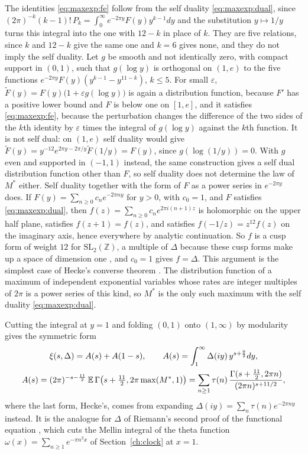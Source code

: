 \begin{remark}\label{rem:maxexp:fe}
The identities \eqref{eq:maxexp:fe} follow from the self duality \eqref{eq:maxexp:dual}, since $(2\pi)^{-k}(k-1)!\,P_k=\int_0^\infty e^{-2\pi y}F(y)y^{k-1}dy$ and the substitution $y\mapsto1/y$ turns this integral into the one with $12-k$ in place of $k$. They are five relations, since $k$ and $12-k$ give the same one and $k=6$ gives none, and they do not imply the self duality. Let $g$ be smooth and not identically zero, with compact support in $(0,1)$, such that $g(\log y)$ is orthogonal on $(1,e)$ to the five functions $e^{-2\pi y}F(y)(y^{k-1}-y^{11-k})$, $k\le5$. For small $\varepsilon$, $\tilde F(y)=F(y)\big(1+\varepsilon g(\log y)\big)$ is again a distribution function, because $F'$ has a positive lower bound and $F$ is below one on $[1,e]$, and it satisfies \eqref{eq:maxexp:fe}, because the perturbation changes the difference of the two sides of the $k$th identity by $\varepsilon$ times the integral of $g(\log y)$ against the $k$th function. It is not self dual: on $(1,e)$ self duality would give $\tilde F(y)=y^{-12}e^{2\pi y-2\pi/y}\tilde F(1/y)=F(y)$, since $g(\log(1/y))=0$. With $g$ even and supported in $(-1,1)$ instead, the same construction gives a self dual distribution function other than $F$, so self duality does not determine the law of $M^*$ either. Self duality together with the form of $F$ as a power series in $e^{-2\pi y}$ does. If $F(y)=\sum_{n\ge0}c_ne^{-2\pi ny}$ for $y>0$, with $c_0=1$, and $F$ satisfies \eqref{eq:maxexp:dual}, then $f(z)=\sum_{n\ge0}c_ne^{2\pi i(n+1)z}$ is holomorphic on the upper half plane, satisfies $f(z+1)=f(z)$, and satisfies $f(-1/z)=z^{12}f(z)$ on the imaginary axis, hence everywhere by analytic continuation. So $f$ is a cusp form of weight $12$ for $\mathrm{SL}_2(\mathbb Z)$, a multiple of $\Delta$ because these cusp forms make up a space of dimension one \cite[Chapter 14]{IwaniecKowalski04}, and $c_0=1$ gives $f=\Delta$. This argument is the simplest case of Hecke's converse theorem \cite{Hecke36}. The distribution function of a maximum of independent exponential variables whose rates are integer multiples of $2\pi$ is a power series of this kind, so $M^*$ is the only such maximum with the self duality \eqref{eq:maxexp:dual}.
\end{remark}

Cutting the integral at $y=1$ and folding $(0,1)$ onto $(1,\infty)$ by modularity gives the symmetric form
\begin{gather}
\xi(s,\Delta)=A(s)+A(1-s),\qquad A(s)=\int_1^\infty\Delta(iy)\,y^{s+\frac92}dy,\label{eq:maxexp:sym}\\
A(s)=(2\pi)^{-s-\frac{11}2}\,\mathbb{E}\,\Gamma\big(s+\tfrac{11}2,2\pi\max(M^*,1)\big)=\sum_{n\ge1}\tau(n)\,\frac{\Gamma(s+\frac{11}2,2\pi n)}{(2\pi n)^{s+11/2}},\nonumber
\end{gather}
where the last form, Hecke's, comes from expanding $\Delta(iy)=\sum_n\tau(n)e^{-2\pi ny}$ instead. It is the analogue for $\Delta$ of Riemann's second proof of the functional equation \cite[Chapter 1]{Edwards}, which cuts the Mellin integral of the theta function $\omega(x)=\sum_{n\ge1}e^{-\pi n^2x}$ of Section~\ref{ch:clock} at $x=1$.

